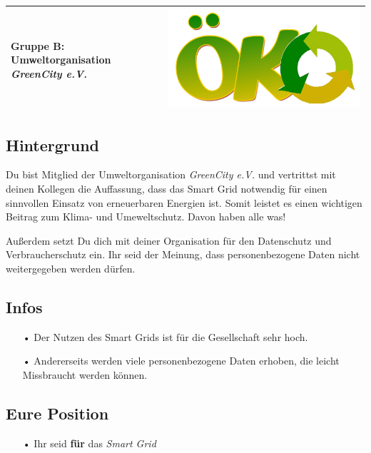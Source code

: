 \documentclass[11pt,a4paper,DIV=10,parskip=half,BCOR=0mm]{scrartcl}
\begin{document}
%
\setlength{\tabcolsep}{0mm} %
\begin{tabularx}{\linewidth}{lXr}
{\Large\textsf{\textbf{Gruppe B:} Umweltorganisation \textit{GreenCity e.V.}}} & & \includegraphics[scale=0.04]{images/oeko}\\
\hline
\end{tabularx}
%
\subsection*{Hintergrund}
Du bist Mitglied der Umweltorganisation \textit{GreenCity e.V.} und vertrittst
mit deinen Kollegen die Auffassung, dass das Smart Grid notwendig für einen sinnvollen Einsatz von erneuerbaren Energien ist. Somit leistet es einen wichtigen Beitrag zum Klima- und Umeweltschutz. Davon haben alle was!

Außerdem setzt Du dich mit deiner Organisation für den Datenschutz und
Verbraucherschutz ein. Ihr seid der Meinung, dass personenbezogene Daten nicht weitergegeben werden dürfen.
\subsection*{Infos}
\begin{enumerate}
	\item[•]Der Nutzen des Smart Grids ist für die Gesellschaft sehr hoch.
	\item[•]Andererseits werden viele personenbezogene Daten erhoben, die leicht Missbraucht werden können. 
\end{enumerate}
\subsection*{Eure Position}
\begin{enumerate}
	\item[•]Ihr seid \textbf{für} das \textit{Smart Grid}
\end{enumerate}
\end{document}
